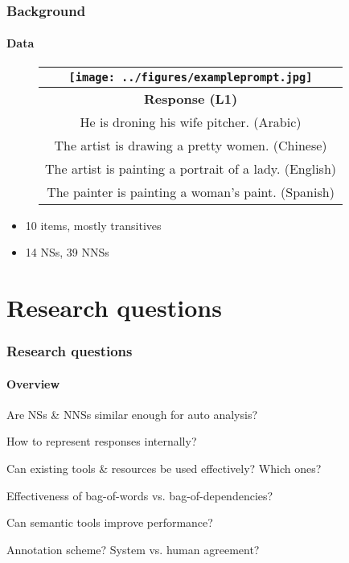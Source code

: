 \documentclass{beamer}
\begin{document}
\begin{frame}
\frametitle{Background}
\framesubtitle{Data}
\footnotesize
\begin{figure}[width=0.8\columnwidth]
\begin{center}
\begin{tabular}{|c|}
\hline
\texttt{[image: ../figures/exampleprompt.jpg]}\\
\hline
\textbf{Response (L1)}\\
\hline
He is droning his wife pitcher. (Arabic)\\
\hline
The artist is drawing a pretty women. (Chinese) \\
\hline
The artist is painting a portrait of a lady. (English) \\
\hline
The painter is painting a woman's paint. (Spanish)\\
\hline
\end{tabular}
\end{center}
\end{figure}
\begin{itemize}
\item 10 items, mostly transitives
\item 14 NSs, 39 NNSs
\end{itemize}
\end{frame}


\section{Research questions}

\begin{frame}
\frametitle{Research questions}
\framesubtitle{Overview}
\begin{enumerate}
{\item Are NSs \& NNSs similar enough for auto analysis?}
{\item How to represent responses internally?}
{\item Can existing tools \& resources be used effectively? Which ones?}
{\item Effectiveness of bag-of-words vs. bag-of-dependencies?}
{\item Can semantic tools improve performance?}
{\item Annotation scheme? System vs. human agreement?}
\end{enumerate}
\end{frame}
\end{document}
